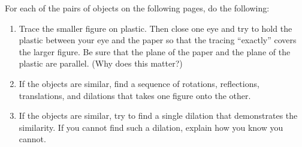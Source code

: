 \begin{prob}
For each of the pairs of objects on the following pages, do the following:  
\begin{enumerate}
\item Trace the smaller figure on plastic.  Then close one eye and try to hold the plastic between your eye and the paper so that the tracing ``exactly'' covers the larger figure.   Be sure that the plane of the paper and the plane of the plastic are parallel.  (Why does this matter?) 
\item If the objects are similar, find a sequence of rotations, reflections, translations, and dilations that takes one figure onto the other.  
\item If the objects are similar, try to find a single dilation that demonstrates the similarity.   If you cannot find such a dilation, explain how you know you cannot.  
\end{enumerate}
\end{prob}
\vfill

